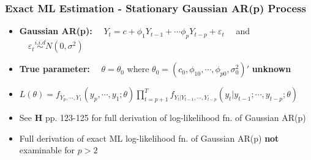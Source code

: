 \documentclass{beamer}
\begin{document}
			
					\begin{frame}
				\frametitle{Exact ML Estimation - Stationary Gaussian AR(p) Process}
				\begin{itemize}
					
					\item[]  \textbf{Gaussian AR(p):} $\quad Y_t=c+\phi_{1} Y_{t-1}+\cdots \phi_{p}Y_{t-p} +\varepsilon_t\quad$ and $\quad\varepsilon_t \overset{i.i.d}{\sim} N(0,\sigma^2)$
					\pause
					\vspace{19pt}
					
					\item[]   \textbf{True parameter:} $\quad \theta=\theta_0$ where $\theta_0=(c_0, \phi_{10}, \cdots, \phi_{p0}, \sigma_0^2)'$ \textbf{unknown}  
					\pause
					\vspace{25pt} 
					
					
			\item[] $L(\theta)=f_{Y_p,\cdots,Y_1}(y_p,\cdots,y_1 ; \theta) \displaystyle \prod_{t=p+1}^{T} f_{Y_t|Y_{t-1},\cdots, Y_{t-p}}(y_t|y_{t-1};\cdots, y_{t-p} ; \theta)$
									\pause	\vspace{15pt} 
		\item[] See \textbf{H} pp. 123-125 for full derivation of  log-likelihood fn. of  Gaussian AR(p)
		\vspace{10pt} 
		\item[] \hspace{20pt} Full  derivation of exact ML log-likelihood fn.  of Gaussian AR(p) \textbf{not} examinable for $p>2$
		
		
			
				\end{itemize}
		\end{frame}
	
	
	
\end{document}
